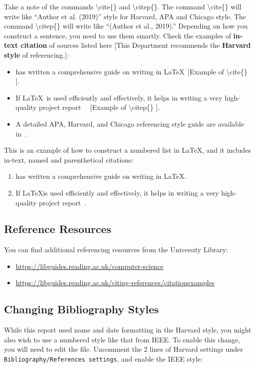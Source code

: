 Take a note of the commands \textbackslash cite\{\} and \textbackslash citep\{\}. The command \textbackslash cite\{\} will write like ``Author et al. (2019)'' style for Harvard, APA and Chicago style. The command \textbackslash citep\{\} will write like ``(Author et al., 2019).'' Depending on how you construct a sentence, you need to use them smartly. Check the examples of \textbf{in-text citation} of sources listed here [This Department recommends the \textbf{Harvard style} of referencing.]:
\begin{itemize}
    \item \cite{kottwitzlatex2021} has written a comprehensive guide on writing in \LaTeX ~[Example of \textbackslash cite\{\} ].
    \item If \LaTeX~is used efficiently and effectively, it helps in writing a very high-quality project report~\citep{lamport1994latex} ~[Example of \textbackslash citep\{\} ].   
    \item A detailed APA, Harvard, and Chicago referencing style guide are available in~\citep{uor_refernce_style}.
\end{itemize}


\noindent 
This is an example of how to construct a numbered list in \LaTeX, and it includes in-text, named and parenthetical citations:
\begin{enumerate}
    \item \cite{kottwitzlatex2021} has written a comprehensive guide on writing in \LaTeX.
    \item If \LaTeX is used efficiently and effectively, it helps in writing a very high-quality project report~\citep{lamport1994latex}.   
\end{enumerate}

\subsection{Reference Resources}\label{subsec:reflinks}
You can find additional referencing resources from the University Library:
\begin{itemize}
    \item \url{https://libguides.reading.ac.uk/computer-science}
    \item \url{https://libguides.reading.ac.uk/citing-references/citationexamples}
\end{itemize}

\subsection{Changing Bibliography Styles}
While this report used name and date formatting in the Harvard style, you might also wish to use a numbered style like that from IEEE.  To enable this change, you will need to edit the  file.  Uncomment the 2 lines of Harvard settings under \texttt{Bibliography/References settings}, and enable the IEEE style:

